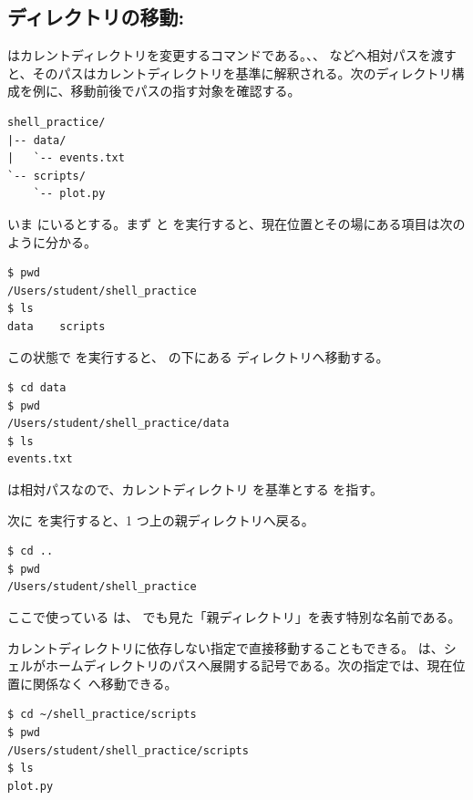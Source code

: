 \subsection{ディレクトリの移動: }

 はカレントディレクトリを変更するコマンドである。、、 などへ相対パスを渡すと、そのパスはカレントディレクトリを基準に解釈される。次のディレクトリ構成を例に、移動前後でパスの指す対象を確認する。

\begin{lstlisting}[numbers=none, xleftmargin=2\zw]
shell_practice/
|-- data/
|   `-- events.txt
`-- scripts/
    `-- plot.py
\end{lstlisting}

いま  にいるとする。まず  と  を実行すると、現在位置とその場にある項目は次のように分かる。

\begin{lstlisting}[numbers=none, xleftmargin=2\zw]
$ pwd
/Users/student/shell_practice
$ ls
data	scripts
\end{lstlisting}

この状態で  を実行すると、 の下にある  ディレクトリへ移動する。

\begin{lstlisting}[numbers=none, xleftmargin=2\zw]
$ cd data
$ pwd
/Users/student/shell_practice/data
$ ls
events.txt
\end{lstlisting}

 は相対パスなので、カレントディレクトリ  を基準とする  を指す。

次に  を実行すると、1 つ上の親ディレクトリへ戻る。

\begin{lstlisting}[numbers=none, xleftmargin=2\zw]
$ cd ..
$ pwd
/Users/student/shell_practice
\end{lstlisting}

ここで使っている  は、 でも見た「親ディレクトリ」を表す特別な名前である。

カレントディレクトリに依存しない指定で直接移動することもできる。\code{\textasciitilde} は、シェルがホームディレクトリのパスへ展開する記号である。次の指定では、現在位置に関係なく  へ移動できる。

\begin{lstlisting}[numbers=none, xleftmargin=2\zw]
$ cd ~/shell_practice/scripts
$ pwd
/Users/student/shell_practice/scripts
$ ls
plot.py
\end{lstlisting}

